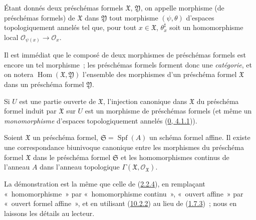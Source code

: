 \begin{definition}[10.4.5]
\label{I.10.4.5-fr}
Étant donnés deux préschémas formels $\mathfrak{X}$, $\mathfrak{Y}$, on
appelle morphisme (de préschémas formels) de $\mathfrak{X}$ dans
$\mathfrak{Y}$ tout morphisme $(\psi,\theta)$ d'espaces topologiquement
annelés tel que, pour tout $x\in\mathfrak{X}$, $\theta_x^\sharp$ soit un
homomorphisme local
$\mathscr{O}_{\psi(x)}\to\mathscr{O}_x$.
\end{definition}

Il est immédiat que le composé de deux morphismes de préschémas formels est
encore un tel morphisme~; les préschémas formels forment donc une
\emph{catégorie}, et on notera
$\operatorname{Hom}(\mathfrak{X},\mathfrak{Y})$ l'ensemble des morphismes
d'un préschéma formel $\mathfrak{X}$ dans un préschéma formel
$\mathfrak{Y}$.

Si $U$ est une partie ouverte de $\mathfrak{X}$, l'injection canonique
dans $\mathfrak{X}$ du préschéma formel induit par $\mathfrak{X}$ sur $U$
est un morphisme de préschémas formels (et même un
\emph{monomorphisme} d'espaces topologiquement annelés
(\hyperref[0.4.1.1-fr]{0, 4.1.1})).

\begin{proposition}[10.4.6]
\label{I.10.4.6-fr}
Soient $\mathfrak{X}$ un préschéma formel,
$\mathfrak{S}=\operatorname{Spf}(A)$ un schéma formel affine. Il existe
une correspondance biunivoque canonique entre les morphismes du préschéma
formel $\mathfrak{X}$ dans le préschéma formel $\mathfrak{S}$ et les
homomorphismes continus de l'anneau $A$ dans l'anneau topologique
$\Gamma(\mathfrak{X},\mathscr{O}_{\mathfrak{X}})$.
\end{proposition}

La démonstration est la même que celle de
(\hyperref[I.2.2.4-fr]{2.2.4}), en remplaçant «~homomorphisme~» par
«~homomorphisme continu~», «~ouvert affine~» par «~ouvert formel
affine~», et en utilisant (\hyperref[I.10.2.2-fr]{10.2.2}) au lieu de
(\hyperref[I.1.7.3-fr]{1.7.3})~; nous en laissons les détails au lecteur.

